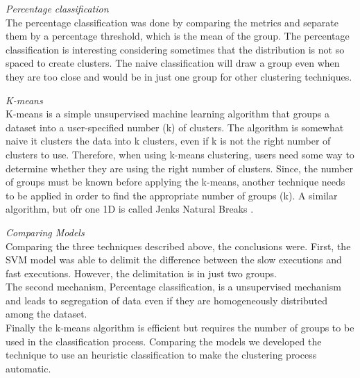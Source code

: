     
    

\textit{Percentage classification}\\
The percentage classification was done by comparing the metrics and separate them by a percentage threshold, which is the mean of the group. The percentage classification is interesting considering sometimes that the distribution is not so spaced to create clusters. The naive classification will draw a group even when they are too close and would be in just one group for other clustering techniques.
    
\textit{K-means}\\
K-means is a simple unsupervised machine learning algorithm that groups a dataset into a user-specified number (k) of clusters. The algorithm is somewhat naive it clusters the data into k clusters, even if k is not the right number of clusters to use. Therefore, when using k-means clustering, users need some way to determine whether they are using the right number of clusters.
Since, the number of groups must be known before applying the k-means, another technique needs to be applied in order to find the appropriate number of groups (k). A similar algorithm, but ofr one 1D is called Jenks Natural Breaks \cite{break}.
    
     
    
\textit{Comparing Models}\\
Comparing the three techniques described above, the conclusions were. First, the SVM model was able to delimit the difference between the slow executions and fast executions. However, the delimitation is in just two groups. \\
The second mechanism, Percentage classification, is a unsupervised mechanism and leads to segregation of data even if they are homogeneously distributed among the dataset. \\
Finally the k-means algorithm is efficient but requires the number of groups to be used in the classification process. Comparing the models we developed the technique to use an heuristic classification to make the clustering process automatic.
    
